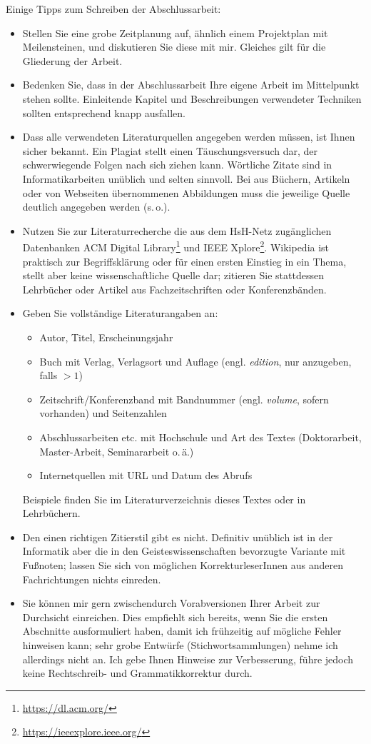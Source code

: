 Einige Tipps zum Schreiben der Abschlussarbeit:
\begin{itemize}
  \item Stellen Sie eine grobe Zeitplanung auf, ähnlich einem Projektplan mit Meilensteinen,
    und diskutieren Sie diese mit mir.
    Gleiches gilt für die Gliederung der Arbeit.
  \item Bedenken Sie, dass in der Abschlussarbeit Ihre eigene Arbeit im Mittelpunkt stehen
    sollte.
    Einleitende Kapitel und Beschreibungen verwendeter Techniken sollten entsprechend
    knapp ausfallen.
  \item Dass alle verwendeten Literaturquellen angegeben werden müssen, ist Ihnen
    sicher bekannt. Ein Plagiat stellt einen Täuschungsversuch dar, der schwerwiegende Folgen 
    nach sich ziehen kann.
    Wörtliche Zitate sind in Informatikarbeiten unüblich und selten sinnvoll.
    Bei aus Büchern, Artikeln oder von Webseiten übernommenen Abbildungen muss
    die jeweilige Quelle deutlich angegeben werden (s.\,o.).
  \item Nutzen Sie zur Literaturrecherche die aus dem HsH-Netz zugänglichen Datenbanken
    ACM Digital Library\footnote{\url{https://dl.acm.org/}} und IEEE Xplore\footnote{\url{https://ieeexplore.ieee.org/}}.
    Wikipedia ist praktisch zur Begriffsklärung oder für einen ersten Einstieg in ein Thema,
    stellt aber keine wissenschaftliche Quelle dar; zitieren Sie stattdessen Lehrbücher
    oder Artikel aus Fachzeitschriften oder Konferenzbänden.
  \item Geben Sie vollständige Literaturangaben an:
    \begin{itemize}
      \item Autor, Titel, Erscheinungsjahr
      \item Buch mit Verlag, Verlagsort und Auflage (engl. \emph{edition}, nur anzugeben,
       falls $>1$)
      \item Zeitschrift/Konferenzband mit Bandnummer (engl. \emph{volume}, sofern vorhanden)
         und Seitenzahlen
      \item Abschlussarbeiten etc. mit Hochschule und Art des Textes (Doktorarbeit,
        Master-Arbeit, Seminararbeit o.\,ä.)
      \item Internetquellen mit URL und Datum des Abrufs
    \end{itemize}
    Beispiele finden Sie im Literaturverzeichnis dieses Textes oder in Lehrbüchern.
  \item Den einen richtigen Zitierstil gibt es nicht.
    Definitiv unüblich ist in der Informatik aber die in den Geisteswissenschaften bevorzugte
    Variante mit Fußnoten; lassen Sie sich von möglichen KorrekturleserInnen aus anderen
    Fachrichtungen nichts einreden.
  \item Sie können mir gern zwischendurch Vorabversionen Ihrer Arbeit zur Durchsicht
    einreichen.
    Dies empfiehlt sich bereits, wenn Sie die ersten Abschnitte ausformuliert
    haben, damit ich frühzeitig auf mögliche Fehler hinweisen kann; sehr grobe Entwürfe
    (Stichwortsammlungen) nehme ich allerdings nicht an.
    Ich gebe Ihnen Hinweise zur Verbesserung, führe jedoch keine Rechtschreib- und
    Grammatikkorrektur durch.
    

\end{itemize}
